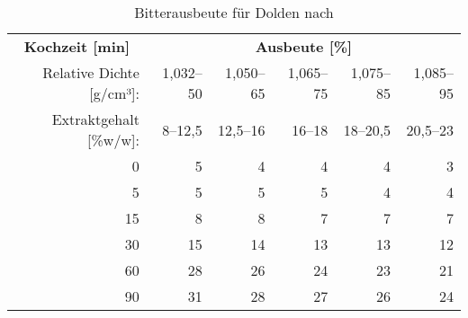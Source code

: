 \documentclass[a4paper,parskip=half]{scrartcl}
\begin{document}
\begin{table}[H]
\centering
\begin{tabular}{rrrrrr} 
\toprule
\multicolumn{1}{c}{\textbf{Kochzeit [min]}} & \multicolumn{5}{c}{\textbf{Ausbeute [\%]}}                                 \\
Relative Dichte [g/cm³]:                    & 1,032–50 & 1,050–65 & 1,065–75 & 1,075–85 & 1,085–95  \\
Extraktgehalt [\%w/w]:                    & 8–12,5 & 12,5–16 & 16–18 & 18–20,5 & 20,5–23  \\
\midrule                                             
0                                            & 5        & 4        & 4                            & 4                            & 3                             \\
5                                            & 5        & 5        & 5                            & 4                            & 4                             \\
15                                           & 8        & 8        & 7                            & 7                            & 7                             \\
30                                           & 15       & 14       & 13                           & 13                           & 12                            \\
60                                           & 28       & 26       & 24                           & 23                           & 21                            \\
90                                           & 31       & 28       & 27                           & 26                           & 24                            \\
\bottomrule
\end{tabular}
\caption{Bitterausbeute für Dolden nach \citeauthor{Noonan1996} \parencite[215]{Noonan1996}}
\label{table:noonanutil}
\end{table}
\end{document}
